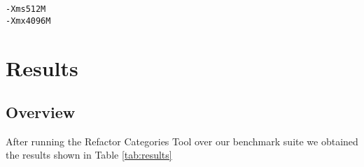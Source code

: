 \begin{verbatim}
-Xms512M 
-Xmx4096M
\end{verbatim}



% 
% 
% 



\section{Results}
\subsection{Overview}
After running the Refactor Categories Tool over our benchmark suite we obtained the results shown in Table \ref{tab:results}

